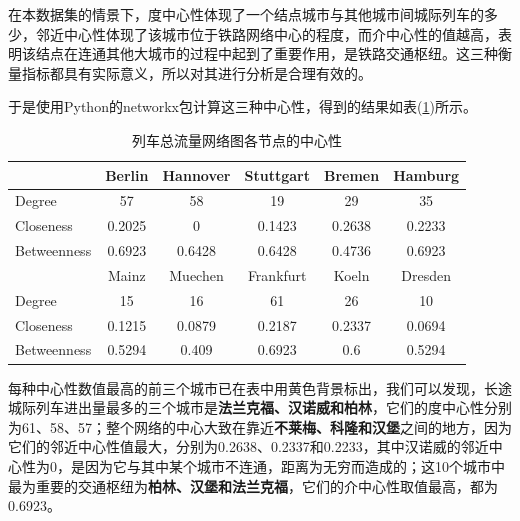 \documentclass[lang=cn,12pt,a4paper,cite=authoryear]{elegantpaper}
\begin{document}
在本数据集的情景下，度中心性体现了一个结点城市与其他城市间城际列车的多少，邻近中心性体现了该城市位于铁路网络中心的程度，而介中心性的值越高，表明该结点在连通其他大城市的过程中起到了重要作用，是铁路交通枢纽。这三种衡量指标都具有实际意义，所以对其进行分析是合理有效的。

于是使用Python的networkx包计算这三种中心性，得到的结果如表(\ref{tab3})所示。

\begin{table}[H]
	\centering
	\caption{列车总流量网络图各节点的中心性}
	\label{tab3}
	\begin{tabular}{l|ccccc}
		\hline
		& Berlin                         & Hannover                   & Stuttgart                      & Bremen                         & Hamburg                        \\ \hline
		Degree      & \cellcolor[HTML]{FFFFC7}57     & \cellcolor[HTML]{FFFFC7}58 & 19                             & 29                             & 35                             \\
		Closeness   & 0.2025                         & 0                          & 0.1423                         & \cellcolor[HTML]{FFFFC7}0.2638 & \cellcolor[HTML]{FFFFC7}0.2233 \\
		Betweenness & \cellcolor[HTML]{FFFFC7}0.6923 & 0.6428                     & 0.6428                         & 0.4736                         & \cellcolor[HTML]{FFFFC7}0.6923 \\ \hline
		& Mainz                          & Muechen                    & Frankfurt                      & Koeln                          & Dresden                        \\ \hline
		Degree      & 15                             & 16                         & \cellcolor[HTML]{FFFFC7}61     & 26                             & 10                             \\
		Closeness   & 0.1215                         & 0.0879                     & 0.2187                         & \cellcolor[HTML]{FFFFC7}0.2337 & 0.0694                         \\
		Betweenness & 0.5294                         & 0.409                      & \cellcolor[HTML]{FFFFC7}0.6923 & 0.6                            & 0.5294                        
	\end{tabular}
\end{table}

每种中心性数值最高的前三个城市已在表中用黄色背景标出，我们可以发现，长途城际列车进出量最多的三个城市是\textbf{法兰克福、汉诺威和柏林}，它们的度中心性分别为61、58、57；整个网络的中心大致在靠近\textbf{不莱梅、科隆和汉堡}之间的地方，因为它们的邻近中心性值最大，分别为0.2638、0.2337和0.2233，其中汉诺威的邻近中心性为0，是因为它与其中某个城市不连通，距离为无穷而造成的；这10个城市中最为重要的交通枢纽为\textbf{柏林、汉堡和法兰克福}，它们的介中心性取值最高，都为0.6923。
\end{document}
